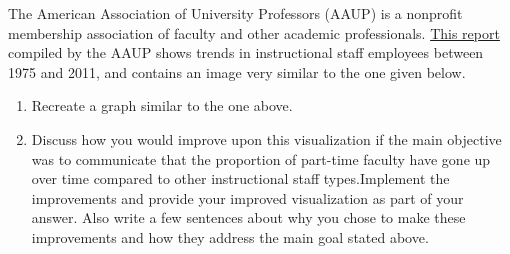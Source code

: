 \documentclass[
]{article}
\begin{document}
The American Association of University Professors (AAUP) is a nonprofit
membership association of faculty and other academic professionals.
\href{https://www.aaup.org/sites/default/files/files/AAUP_Report_InstrStaff-75-11_apr2013.pdf}{This
report} compiled by the AAUP shows trends in instructional staff
employees between 1975 and 2011, and contains an image very similar to
the one given below.

\begin{enumerate}
\def\labelenumi{\arabic{enumi}.}
\setcounter{enumi}{5}
\item
  Recreate a graph similar to the one above.
\item
  Discuss how you would improve upon this visualization if the main
  objective was to communicate that the proportion of part-time faculty
  have gone up over time compared to other instructional staff
  types.Implement the improvements and provide your improved
  visualization as part of your answer. Also write a few sentences about
  why you chose to make these improvements and how they address the main
  goal stated above.
\end{enumerate}
\end{document}
